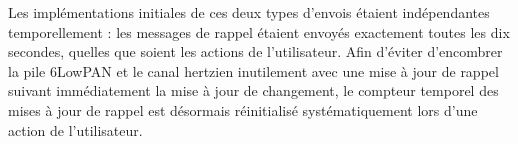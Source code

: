 Les implémentations initiales de ces deux types d’envois étaient indépendantes temporellement : les messages de rappel étaient envoyés exactement toutes les dix secondes, quelles que soient les actions de l’utilisateur.
Afin d’éviter d’encombrer la pile 6LowPAN et le canal hertzien inutilement avec une mise à jour de rappel suivant immédiatement la mise à jour de changement, le compteur temporel des mises à jour de rappel est désormais réinitialisé systématiquement lors d’une action de l’utilisateur.
